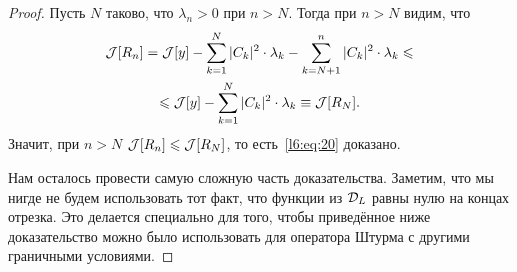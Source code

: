 \begin{proof}
	\noindent Пусть $N$ таково, что $\lambda_n>0$ при $n>N$. Тогда при $n>N$ видим, что 
	\begin{multline*}
		\mathcal{J}[R_n]=\mathcal{J}[y]-\sum\limits_{k=1}^{N}|C_k|^2\cdot\lambda_k-\sum\limits_{k=N+1}^{n}|C_k|^2\cdot\lambda_k\leqslant\\\leqslant\mathcal{J}[y]-\sum\limits_{k=1}^{N}|C_k|^2\cdot\lambda_k\equiv\mathcal{J}[R_N].
	\end{multline*} 
	Значит{\mb,} при $n>N$ $\mathcal{J}[R_n]\leqslant\mathcal{J}[R_N]$, то есть~\eqref{l6:eq:20} доказано.
	
	Нам осталось провести самую сложную часть доказательства. Заметим, что мы нигде не будем использовать тот факт, что функции из $\mathcal{D}_L$ равны нулю на концах отрезка. Это делается специально для того, чтобы приведённое ниже доказательство можно было использовать для оператора Штурма с другими граничными условиями. 
	

\end{proof}

